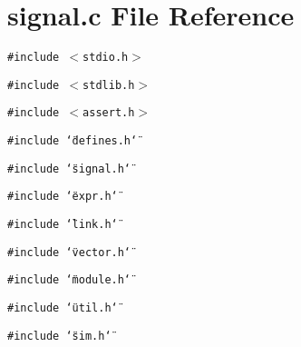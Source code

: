 \section{signal.c File Reference}
\label{signal_8c}
{\tt \#include $<$stdio.h$>$}\par
{\tt \#include $<$stdlib.h$>$}\par
{\tt \#include $<$assert.h$>$}\par
{\tt \#include \char`\"{}defines.h\char`\"{}}\par
{\tt \#include \char`\"{}signal.h\char`\"{}}\par
{\tt \#include \char`\"{}expr.h\char`\"{}}\par
{\tt \#include \char`\"{}link.h\char`\"{}}\par
{\tt \#include \char`\"{}vector.h\char`\"{}}\par
{\tt \#include \char`\"{}module.h\char`\"{}}\par
{\tt \#include \char`\"{}util.h\char`\"{}}\par
{\tt \#include \char`\"{}sim.h\char`\"{}}\par
